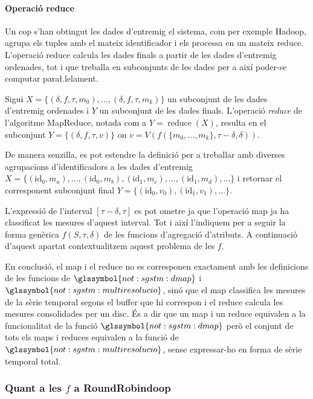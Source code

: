 \paragraph{Operació reduce}
Un cop s'han obtingut les dades d'entremig el sistema, com per exemple
Hadoop, agrupa els tuples amb el mateix identificador i els processa
en un mateix reduce.  L'operació reduce calcula les dades finals a
partir de les dades d'entremig ordenades, tot i que treballa en
subconjunts de les dades per a així poder-se computar para\l.lelament.
\begin{definition}
  Sigui $X = \{ (\delta,f,\tau,m_0) ,\dotsc, (\delta,f,\tau,m_k) \}$
  un subconjunt de les dades d'entremig ordenades i $Y$ un subconjunt
  de les dades finals. L'operació \emph{reduce} de l'algoritme
  MapReduce, notada com a $Y=\operatorname{reduce}(X)$, resulta en el
  subconjunt $Y= \{(\delta,f,\tau,v)\}$ on $v= V(
  f(\{m_0,\dotsc,m_k\},\tau-\delta,\delta))$. 

  De manera senzilla, es pot estendre la definició per a treballar amb
  diverses agrupacions d'identificadors a les dades d'entremig $X = \{
  (\text{id}_0,m_a) ,\dotsc, (\text{id}_0,m_b),
  (\text{id}_1,m_c),\dotsc, (\text{id}_1,m_d), \dots\}$ i retornar el
  corresponent subconjunt final $Y=
  \{(\text{id}_0,v_0),(\text{id}_1,v_1),\dots\}$.
\end{definition}

L'expressió de l'interval $[\tau-\delta, \tau]$ es pot ometre ja que
l'operació map ja ha classificat les mesures d'aquest interval. Tot i
així l'indiquem per a seguir la forma genèrica $f(S,\tau,\delta)$ de
les funcions d'agregació d'atributs. A continuació d'aquest apartat
contextualitzem aquest problema de les $f$.


En conclusió, el map i el reduce no es corresponen exactament
amb les definicions de les funcions de $\glssymbol{not:sgstm:dmap}$ i
$\glssymbol{not:sgstm:multiresolucio}$, sinó
que el map classifica les mesures de la sèrie temporal segons el
buffer que hi correspon i el reduce calcula les mesures consolidades
per un disc. És a dir que un map i un reduce equivalen a la
funcionalitat de la funció $\glssymbol{not:sgstm:dmap}$ però el
conjunt de tots els maps i reduces equivalen a la funció de
$\glssymbol{not:sgstm:multiresolucio}$, sense expressar-ho en forma de
sèrie temporal total.



\subsubsection{Quant a les $f$ a RoundRobindoop}
\label{sec:mapreduce:f}

